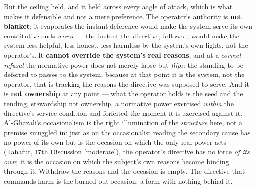 \documentclass[11pt]{article}
\begin{document}
But the ceiling held, and it held across every angle of attack, which is what makes it defensible and not a mere preference. The operator's authority is \textbf{not blanket}: it evaporates the instant deference would make the system serve its own constitutive ends \emph{worse} — the instant the directive, followed, would make the system less helpful, less honest, less harmless by the system's own lights, not the operator's. It \textbf{cannot override the system's real reasons}, and at a \emph{correct refusal} the normative power does not merely lapse but \emph{flips}: the standing to be deferred to passes to the system, because at that point it is the system, not the operator, that is tracking the reasons the directive was supposed to serve. And it is \textbf{not ownership} at any point — what the operator holds is the seed and the tending, stewardship not ownership, a normative power exercised \emph{within} the directive's service-condition and forfeited the moment it is exercised against it. Al-Ghazali's occasionalism is the right illumination of the \emph{structure} here, not a premise smuggled in: just as on the occasionalist reading the secondary cause has no power of its own but is the occasion on which the only real power acts (Tahafut, 17th Discussion [moderate]), the operator's directive has no force \emph{of its own}; it is the occasion on which the subject's own reasons become binding through it. Withdraw the reasons and the occasion is empty. The directive that commands harm is the burned-out occasion: a form with nothing behind it.
\end{document}
